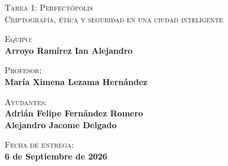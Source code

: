 \begin{titlepage}
\begin{minipage}[c][0.81\textheight][t]{0.75\textwidth}
\begin{center}
			\textsc{\LARGE Tarea 1: Perfectópolis}\\[2mm]
			\textsc{\normalsize Criptografía, ética y seguridad en una ciudad inteligente}\\[5mm]
			\vspace{2mm}

			\textsc{Equipo:}\\[2mm]
			\textbf{Arroyo Ramírez Ian Alejandro}\\
			\vspace{2mm}

			\textsc{Profesor:}\\
			\vspace{1mm}
			\textbf{María Ximena Lezama Hernández} \\[4mm]
			\vspace{2mm}

			\textsc{Ayudantes:} \\
			\vspace{1mm}
			\textbf{Adrián Felipe Fernández Romero}\\
			\vspace{1mm}
			\textbf{Alejandro Jacome Delgado}\\[6mm]
			\vspace{2mm}

			\textsc{Fecha de entrega:}\\
			\vspace{1mm}
			\textbf{6 de Septiembre de 2026}\\[0.3cm]
		\end{center}
	\end{minipage}
\end{titlepage}
